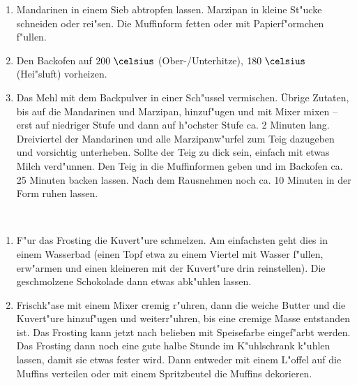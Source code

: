 
\begin{enumerate}
 \item Mandarinen in einem Sieb abtropfen lassen. Marzipan in kleine St"ucke schneiden oder rei"sen. Die Muffinform fetten oder mit Papierf"ormchen f"ullen.
 \item Den Backofen auf $200~\celsius$ (Ober-/Unterhitze), $180~\celsius$ (Hei"sluft) vorheizen.
 \item Das Mehl mit dem Backpulver in einer Sch"ussel vermischen. Übrige Zutaten, bis auf die Mandarinen und Marzipan, hinzuf"ugen und mit Mixer mixen – erst auf niedriger Stufe und dann auf h"ochster Stufe ca. 2 Minuten lang. Dreiviertel der Mandarinen und alle Marzipanw"urfel zum Teig dazugeben und vorsichtig unterheben. Sollte der Teig zu dick sein, einfach mit etwas Milch verd"unnen. Den Teig in die Muffinformen geben und im Backofen ca. 25 Minuten backen lassen. Nach dem Rausnehmen noch ca. 10 Minuten in der Form ruhen lassen.

\end{enumerate}
\hspace{0em}\\
\begin{enumerate}
 \item F"ur das Frosting die Kuvert"ure schmelzen.
 Am einfachsten geht dies in einem Wasserbad (einen Topf etwa zu einem Viertel mit Wasser f"ullen, erw"armen und einen kleineren mit der Kuvert"ure drin reinstellen). 
 Die geschmolzene Schokolade dann etwas abk"uhlen lassen.
 \item Frischk"ase mit einem Mixer cremig r"uhren, dann die weiche Butter und die Kuvert"ure hinzuf"ugen und weiterr"uhren, bis eine cremige Masse entstanden ist. Das Frosting kann jetzt nach belieben mit Speisefarbe eingef"arbt werden.
Das Frosting dann noch eine gute halbe Stunde im K"uhlschrank k"uhlen lassen, damit sie etwas fester wird. Dann entweder mit einem L"offel auf die Muffins verteilen oder mit einem Spritzbeutel die Muffins dekorieren.
\end{enumerate}

